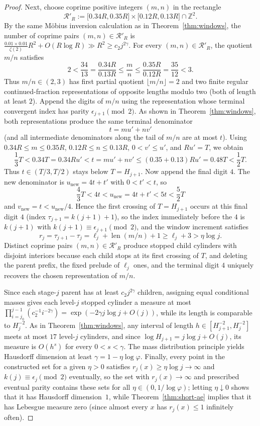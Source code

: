 \documentclass[11pt]{article}
\theoremstyle{definition}
\theoremstyle{remark}
\newcommand{\Z}{\mathbb{Z}}
\begin{document}
\begin{proof}
Next, choose coprime positive integers $(m,n)$ in the rectangle
\[
\mathcal R'_R:=\bigl[0.34R,0.35R\bigr]\times\bigl[0.12R,0.13R\bigr]\cap\Z^2.
\]
By the same M\"obius inversion calculation as in Theorem~\ref{thm:windows}, the
number of coprime pairs $(m,n)\in\mathcal R'_R$ is
$\frac{0.01\times0.01}{\zeta(2)}R^2+O(R\log R)\gg R^2\ge c_2 j^{2\gamma}$. For
every $(m,n)\in\mathcal R'_R$, the quotient $m/n$ satisfies
\[
2<\frac{34}{13}=\frac{0.34R}{0.13R}\le\frac{m}{n}\le\frac{0.35R}{0.12R}=\frac{35}{12}<3.
\]
Thus $m/n\in(2,3)$ has first partial quotient $\lfloor m/n\rfloor=2$ and two
finite regular continued-fraction representations of opposite lengths modulo
two (both of length at least $2$). Append the digits of $m/n$ using the
representation whose terminal convergent index has parity
$\epsilon_{j+1}\pmod2$. As shown in Theorem~\ref{thm:windows}, both
representations produce the same terminal denominator
\[
t=mu'+nv'
\]
(and all intermediate denominators along the tail of $m/n$ are at most $t$).
Using $0.34R\le m\le0.35R$, $0.12R\le n\le0.13R$, $0<v'\le u'$, and $Ru'=T$, we
obtain
\[
\frac13 T<0.34T=0.34Ru'<t=mu'+nv'\le(0.35+0.13)Ru'=0.48T<\frac12 T.
\]
Thus $t\in(T/3,T/2)$ stays below $T=H_{j+1}$. Now append the final digit $4$.
The new denominator is $u_{\mathrm{new}}=4t+t'$ with $0<t'<t$, so
\[
\frac43 T<4t<u_{\mathrm{new}}=4t+t'<5t<\frac52 T
\]
and $v_{\mathrm{new}}=t<u_{\mathrm{new}}/4$. Hence the first crossing of
$T=H_{j+1}$ occurs at this final digit $4$ (index $\tau_{j+1}=k(j+1)+1$), so the
index immediately before the $4$ is $k(j+1)$ with
$k(j+1)\equiv\epsilon_{j+1}\pmod2$, and the window increment satisfies
\[
r_j=\tau_{j+1}-\tau_j=\ell_j+\operatorname{len}(m/n)+1\ge\ell_j+3>\eta\log j.
\]
Distinct coprime pairs $(m,n)\in\mathcal R'_R$ produce stopped child cylinders
with disjoint interiors because each child stops at its first crossing of $T$,
and deleting the parent prefix, the fixed prelude of $\ell_j$ ones, and the
terminal digit $4$ uniquely recovers the chosen representation of $m/n$.

Since each stage-$j$ parent has at least $c_2 j^{2\gamma}$ children, assigning
equal conditional masses gives each level-$j$ stopped cylinder a measure at most
$\prod_{i=j_0}^{j-1}(c_2^{-1}i^{-2\gamma})=\exp(-2\gamma j\log j+O(j))$, while
its length is comparable to $H_j^{-2}$. As in Theorem~\ref{thm:windows}, any
interval of length $h\in[H_{j+1}^{-2},H_j^{-2}]$ meets at most $17$ level-$j$
cylinders, and since $\log H_{j+1}=j\log j+O(j)$, its measure is $O(h^s)$ for
every $0<s<\gamma$. The mass distribution principle yields Hausdorff dimension
at least $\gamma=1-\eta\log\varphi$. Finally, every point in the constructed
set for a given $\eta>0$ satisfies $r_j(x)\ge\eta\log j\to\infty$ and
$k(j)\equiv\epsilon_j\pmod2$ eventually, so the set with $r_j(x)\to\infty$ and
prescribed eventual parity contains these sets for all $\eta\in(0,1/\log\varphi)$;
letting $\eta\downarrow0$ shows that it has Hausdorff dimension~$1$, while
Theorem~\ref{thm:short-ae} implies that it has Lebesgue measure zero (since
almost every $x$ has $r_j(x)\le1$ infinitely often).
\end{proof}
\end{document}
